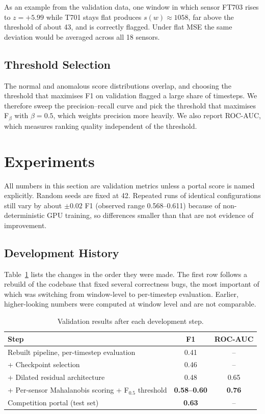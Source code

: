 \documentclass[runningheads]{llncs}
\begin{document}
As an example from the validation data, one window in which sensor FT703 rises to $z = +5.99$ while T701 stays flat produces $s(w) \approx 1058$, far above the threshold of about 43, and is correctly flagged. Under flat MSE the same deviation would be averaged across all 18 sensors.

\subsection{Threshold Selection}

The normal and anomalous score distributions overlap, and choosing the threshold that maximises F1 on validation flagged a large share of timesteps. We therefore sweep the precision--recall curve and pick the threshold that maximises F$_\beta$ with $\beta = 0.5$, which weights precision more heavily. We also report ROC-AUC, which measures ranking quality independent of the threshold.

\section{Experiments}

All numbers in this section are validation metrics unless a portal score is named explicitly. Random seeds are fixed at 42. Repeated runs of identical configurations still vary by about $\pm 0.02$ F1 (observed range 0.568--0.611) because of non-deterministic GPU training, so differences smaller than that are not evidence of improvement.

\subsection{Development History}

Table~\ref{tab:journey} lists the changes in the order they were made. The first row follows a rebuild of the codebase that fixed several correctness bugs, the most important of which was switching from window-level to per-timestep evaluation. Earlier, higher-looking numbers were computed at window level and are not comparable.

\begin{table}[t]
\centering
\caption{Validation results after each development step.}\label{tab:journey}
\begin{tabular}{lcc}
\toprule
Step & F1 & ROC-AUC \\
\midrule
Rebuilt pipeline, per-timestep evaluation & 0.41 & -- \\
+ Checkpoint selection & 0.46 & -- \\
+ Dilated residual architecture & 0.48 & 0.65 \\
+ Per-sensor Mahalanobis scoring + F$_{0.5}$ threshold & \textbf{0.58--0.60} & \textbf{0.76} \\
\midrule
Competition portal (test set) & \textbf{0.63} & -- \\
\bottomrule
\end{tabular}
\end{table}
\end{document}
